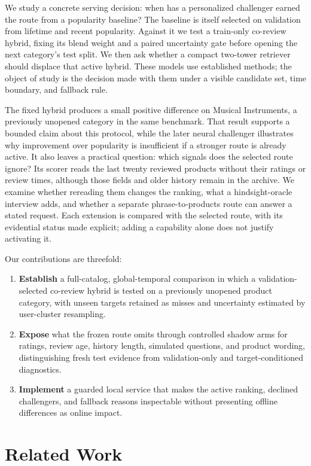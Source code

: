 \documentclass[11pt]{article}
\begin{document}
We study a concrete serving decision: when has a personalized challenger earned the route from a popularity baseline? The baseline is itself selected on validation from lifetime and recent popularity. Against it we test a train-only co-review hybrid, fixing its blend weight and a paired uncertainty gate before opening the next category's test split. We then ask whether a compact two-tower retriever should displace that active hybrid. These models use established methods; the object of study is the decision made with them under a visible candidate set, time boundary, and fallback rule.

The fixed hybrid produces a small positive difference on Musical Instruments, a previously unopened category in the same benchmark. That result supports a bounded claim about this protocol, while the later neural challenger illustrates why improvement over popularity is insufficient if a stronger route is already active. It also leaves a practical question: which signals does the selected route ignore? Its scorer reads the last twenty reviewed products without their ratings or review times, although those fields and older history remain in the archive. We examine whether rereading them changes the ranking, what a hindsight-oracle interview adds, and whether a separate phrase-to-products route can answer a stated request. Each extension is compared with the selected route, with its evidential status made explicit; adding a capability alone does not justify activating it.

Our contributions are threefold:
\begin{enumerate}
\item \textbf{Establish} a full-catalog, global-temporal comparison in which a validation-selected co-review hybrid is tested on a previously unopened product category, with unseen targets retained as misses and uncertainty estimated by user-cluster resampling.
\item \textbf{Expose} what the frozen route omits through controlled shadow arms for ratings, review age, history length, simulated questions, and product wording, distinguishing fresh test evidence from validation-only and target-conditioned diagnostics.
\item \textbf{Implement} a guarded local service that makes the active ranking, declined challengers, and fallback reasons inspectable without presenting offline differences as online impact.
\end{enumerate}

\section{Related Work}
\end{document}
